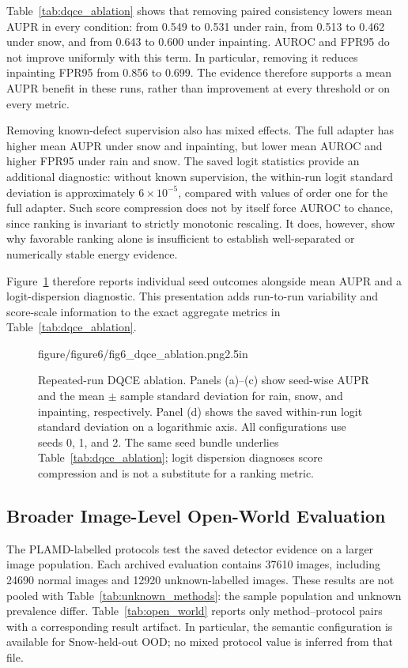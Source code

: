 Table~\ref{tab:dqce_ablation} shows that removing paired consistency lowers
mean AUPR in every condition: from 0.549 to 0.531 under rain, from 0.513 to
0.462 under snow, and from 0.643 to 0.600 under inpainting. AUROC and FPR95
do not improve uniformly with this term. In particular, removing it reduces
inpainting FPR95 from 0.856 to 0.699. The evidence therefore supports a
mean AUPR benefit in these runs, rather than improvement at every threshold
or on every metric.

Removing known-defect supervision also has mixed effects. The full adapter
has higher mean AUPR under snow and inpainting, but lower mean AUROC and
higher FPR95 under rain and snow. The saved logit statistics provide an
additional diagnostic: without known supervision, the within-run logit
standard deviation is approximately $6\times10^{-5}$, compared with values
of order one for the full adapter. Such score compression does not by itself
force AUROC to chance, since ranking is invariant to strictly monotonic
rescaling. It does, however, show why favorable ranking alone is insufficient
to establish well-separated or numerically stable energy evidence.

Figure~\ref{fig:dqce_ablation} therefore reports individual seed outcomes
alongside mean AUPR and a logit-dispersion diagnostic. This presentation adds
run-to-run variability and score-scale information to the exact aggregate
metrics in Table~\ref{tab:dqce_ablation}.

\begin{figure}[!t]
  \centering
    {figure/figure6/fig6_dqce_ablation.png}{2.5in}
  \caption{Repeated-run DQCE ablation. Panels (a)--(c) show seed-wise AUPR
  and the mean $\pm$ sample standard deviation for rain, snow, and
  inpainting, respectively. Panel (d) shows the saved within-run logit
  standard deviation on a logarithmic axis. All configurations use seeds
  0, 1, and 2. The same seed bundle underlies
  Table~\ref{tab:dqce_ablation}; logit dispersion diagnoses score compression
  and is not a substitute for a ranking metric.}
  \label{fig:dqce_ablation}
\end{figure}

\subsection{Broader Image-Level Open-World Evaluation}
\label{subsec:plamd_results}

The PLAMD-labelled protocols test the saved detector evidence on a larger
image population. Each archived evaluation contains 37610 images, including
24690 normal images and 12920 unknown-labelled images. These results are
not pooled with Table~\ref{tab:unknown_methods}: the sample population and
unknown prevalence differ. Table~\ref{tab:open_world} reports only
method--protocol pairs with a corresponding result artifact. In particular,
the semantic configuration is available for Snow-held-out OOD; no mixed
protocol value is inferred from that file.

